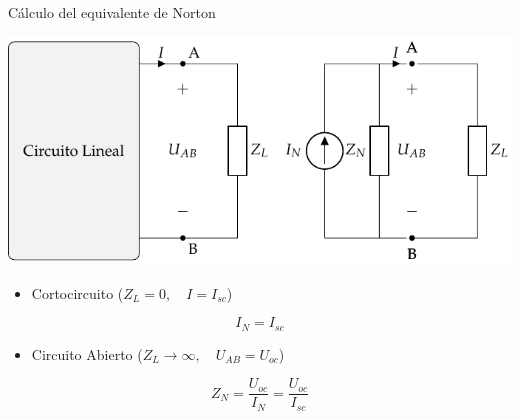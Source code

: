 \documentclass[aspectratio=169, usenames,svgnames,dvipsnames]{beamer}
\begin{document}
\begin{frame}[label={sec:orgfd1bf80}]{Cálculo del equivalente de Norton}
\begin{center}
\includegraphics[height=0.38\textheight]{../figs/EquivalenteNorton.pdf}
\end{center}

\begin{itemize}
\item Cortocircuito (\(Z_L = 0, \quad I = I_{sc}\))
\end{itemize}
\[
\boxed{I_N = I_{sc}}
\]
\begin{itemize}
\item Circuito Abierto (\(Z_L \to \infty, \quad U_{AB} = U_{oc}\))
\end{itemize}
\[
\boxed{Z_N = \frac{U_{oc}}{I_N} = \frac{U_{oc}}{I_{sc}}}
\]
\end{frame}
\end{document}
